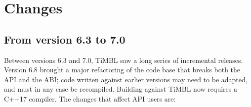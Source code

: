 \documentclass{report}
\begin{document}
\chapter{Changes}
\label{changes}

\section{From version 6.3 to 7.0}

Between versions 6.3 and 7.0, TiMBL saw a long series of incremental
releases. Version 6.8 brought a major refactoring of the code base
that breaks both the API and the ABI; code written against earlier
versions may need to be adapted, and must in any case be
recompiled. Building against TiMBL now requires a C++17 compiler. The
changes that affect API users are:
\end{document}
